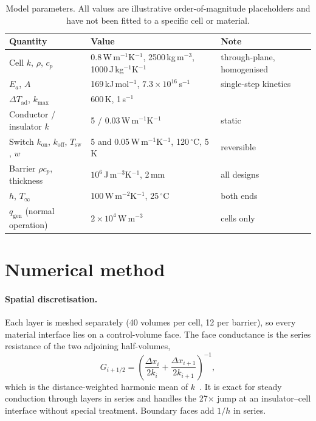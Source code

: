 \documentclass[11pt]{article}
\newcommand{\kon}{k_\mathrm{on}}
\newcommand{\koff}{k_\mathrm{off}}
\newcommand{\Tsw}{T_\mathrm{sw}}
\newcommand{\kmax}{k_\mathrm{max}}
\begin{document}
\begin{table}[!htbp]
  \centering\small
  \caption{Model parameters. All values are illustrative order-of-magnitude placeholders
  and have not been fitted to a specific cell or material.}
  \label{tab:params}
  \begin{tabularx}{\linewidth}{@{}lXl@{}}
    \toprule
    Quantity & Value & Note \\
    \midrule
    Cell $k$, $\rho$, $c_p$ & 0.8\,W\,m$^{-1}$K$^{-1}$, 2500\,kg\,m$^{-3}$,
      1000\,J\,kg$^{-1}$K$^{-1}$ & through-plane, homogenised \\
    $E_a$, $A$ & 169\,kJ\,mol$^{-1}$, $7.3\times10^{16}$\,s$^{-1}$ & single-step kinetics \\
    $\Delta T_\mathrm{ad}$, $\kmax$ & 600\,K, 1\,s$^{-1}$ & \\
    Conductor / insulator $k$ & 5 / 0.03\,W\,m$^{-1}$K$^{-1}$ & static \\
    Switch $\kon$, $\koff$, $\Tsw$, $w$ & 5 and 0.05\,W\,m$^{-1}$K$^{-1}$, 120\,$^\circ$C,
      5\,K & reversible \\
    Barrier $\rho c_p$, thickness & $10^6$\,J\,m$^{-3}$K$^{-1}$, 2\,mm & all designs \\
    $h$, $T_\infty$ & 100\,W\,m$^{-2}$K$^{-1}$, 25\,$^\circ$C & both ends \\
    $q_\mathrm{gen}$ (normal operation) & $2\times10^4$\,W\,m$^{-3}$ & cells only \\
    \bottomrule
  \end{tabularx}
\end{table}

\section{Numerical method}

\paragraph{Spatial discretisation.} Each layer is meshed separately (40 volumes per cell,
12 per barrier), so every material interface lies on a control-volume face. The face
conductance is the series resistance of the two adjoining half-volumes,
\begin{equation}
  G_{i+1/2} = \left( \frac{\Delta x_i}{2k_i} + \frac{\Delta x_{i+1}}{2k_{i+1}} \right)^{-1},
  \label{eq:face}
\end{equation}
which is the distance-weighted harmonic mean of $k$~\cite{patankar1980}. It is exact for
steady conduction through layers in series and handles the 27$\times$ jump at an
insulator--cell interface without special treatment. Boundary faces add $1/h$ in series.
\end{document}
